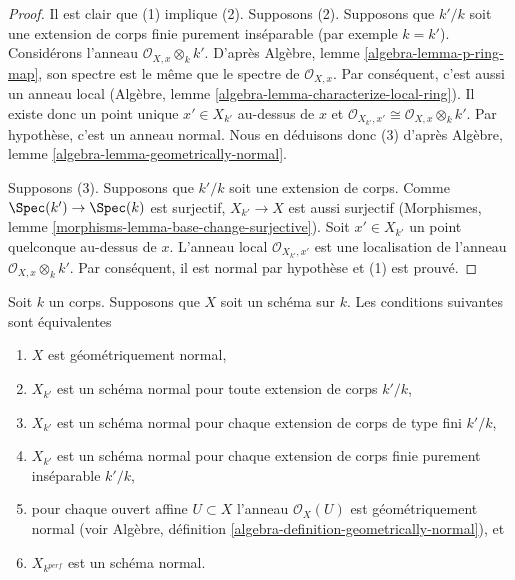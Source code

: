 \begin{proof}
Il est clair que (1) implique (2). Supposons (2).
Supposons que $k'/k$ soit une extension de corps finie
purement inséparable (par exemple $k = k'$). Considérons
l'anneau $\mathcal{O}_{X, x} \otimes_k k'$. D'après
Algèbre, lemme \ref{algebra-lemma-p-ring-map}, son spectre
est le même que le spectre de $\mathcal{O}_{X, x}$. Par
conséquent, c'est aussi un anneau local (Algèbre, lemme
\ref{algebra-lemma-characterize-local-ring}). Il existe donc
un point unique $x' \in X_{k'}$ au-dessus de $x$ et
$\mathcal{O}_{X_{k'}, x'} \cong \mathcal{O}_{X, x} \otimes_k k'$.
Par hypothèse, c'est un anneau normal. Nous en déduisons donc (3)
d'après Algèbre, lemme \ref{algebra-lemma-geometrically-normal}.

\medskip\noindent
Supposons (3). Supposons que $k'/k$ soit une extension de
corps. Comme $\Spec(k') \to \Spec(k)$ est surjectif,
$X_{k'} \to X$ est aussi surjectif (Morphismes, lemme
\ref{morphisms-lemma-base-change-surjective}). Soit
$x' \in X_{k'}$ un point quelconque au-dessus
de $x$. L'anneau local $\mathcal{O}_{X_{k'}, x'}$ est une
localisation de l'anneau $\mathcal{O}_{X, x} \otimes_k k'$.
Par conséquent, il est normal par hypothèse et (1) est prouvé.
\end{proof}

\begin{lemma}
\label{lemma-geometrically-normal}
Soit $k$ un corps.
Supposons que $X$ soit un schéma sur
$k$. Les conditions suivantes sont équivalentes
\begin{enumerate}
\item $X$ est géométriquement normal, \item $X_{k'}$
est un schéma normal pour toute extension de corps
$k'/k$, \item $X_{k'}$ est un schéma normal pour
chaque extension de corps de type fini $k'/k$, \item
$X_{k'}$ est un schéma normal pour chaque extension
de corps finie purement inséparable $k'/k$, \item
pour chaque ouvert affine $U \subset X$ l'anneau
$\mathcal{O}_X(U)$ est géométriquement normal (voir
Algèbre, définition
\ref{algebra-definition-geometrically-normal}), et \item $X_{k^{perf}}$ est un schéma normal.
\end{enumerate}
\end{lemma}

